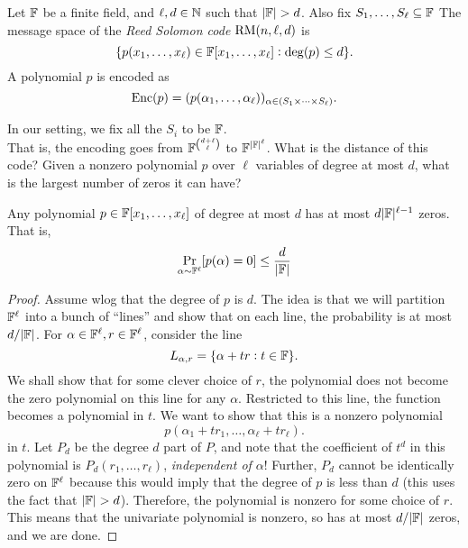 		\begin{fdef}
			Let $\mathbb{F}$ be a finite field, and $\ell,d \in \mathbb{N}$ such that $|\mathbb{F}| > d$. Also fix $S_1,\ldots,S_\ell \subseteq \mathbb{F}$ The message space of the \emph{Reed Solomon code} $\operatorname{RM}(n,\ell,d)$ is
			\[ \{ p(x_1,\ldots,x_\ell) \in \mathbb{F}[x_1,\ldots,x_\ell] : \deg(p) \le d \}. \]
			A polynomial $p$ is encoded as
			\[ \operatorname{Enc}(p) = (p(\alpha_1,\ldots,\alpha_\ell))_{\alpha \in (S_1 \times \cdots \times S_\ell)}. \]
		\end{fdef}

		In our setting, we fix all the $S_i$ to be $\mathbb{F}$.\\
		That is, the encoding goes from $\mathbb{F}^{\binom{d+\ell}{\ell}}$ to $\mathbb{F}^{|\mathbb{F}|^\ell}$. What is the distance of this code? Given a nonzero polynomial $p$ over $\ell$ variables of degree at most $d$, what is the largest number of zeros it can have?

		\begin{fprop}
			Any polynomial $p \in \mathbb{F}[x_1,\ldots,x_\ell]$ of degree at most $d$ has at most $d |\mathbb{F}|^{\ell-1}$ zeros. That is,
			\[ \Pr_{\alpha \sim \mathbb{F}^\ell} [p(\alpha) = 0] \le \frac{d}{|\mathbb{F}|} \]
		\end{fprop}
		\begin{proof}
			Assume wlog that the degree of $p$ is $d$. The idea is that we will partition $\mathbb{F}^\ell$ into a bunch of ``lines'' and show that on each line, the probability is at most $d/|\mathbb{F}|$. For $\alpha \in \mathbb{F}^\ell, r \in \mathbb{F}^\ell$, consider the line
			\[ L_{\alpha,r} = \{ \alpha + tr : t \in \mathbb{F} \}. \]
			We shall show that for some clever choice of $r$, the polynomial does not become the zero polynomial on this line for any $\alpha$. Restricted to this line, the function becomes a polynomial in $t$. We want to show that this is a nonzero polynomial
			\[ p(\alpha_1 + tr_1,\ldots,\alpha_\ell + tr_\ell). \]
			in $t$. Let $P_d$ be the degree $d$ part of $P$, and note that the coefficient of $t^d$ in this polynomial is $P_d(r_1,\ldots,r_\ell)$, \emph{independent of $\alpha$}! Further, $P_d$ cannot be identically zero on $\mathbb{F}^\ell$ because this would imply that the degree of $p$ is less than $d$ (this uses the fact that $|\mathbb{F}| > d$). Therefore, the polynomial is nonzero for some choice of $r$. This means that the univariate polynomial is nonzero, so has at most $d/|\mathbb{F}|$ zeros, and we are done.
		\end{proof}

